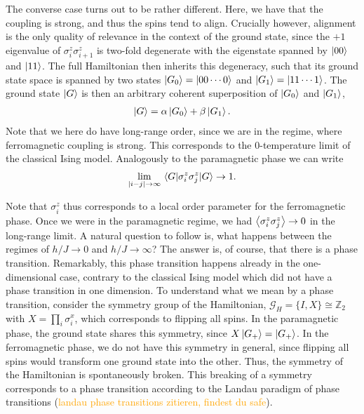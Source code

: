 The converse case turns out to be rather different. Here, we have that the
coupling is strong, and thus the spins tend to align. Crucially however,
alignment is the only quality of relevance in the context of the ground state,
since the $+1$ eigenvalue of $\sigma_i^z\sigma_{i+1}^z$ is two-fold degenerate
with the eigenstate spanned by $\ket{00}$ and $\ket{11}$. The full Hamiltonian
then inherits this degeneracy, such that its ground state space is spanned by
two states $\ket{G_0} = \ket{00\cdots 0}$ and $\ket{G_1} = \ket{11\cdots 1}$.
The ground state $\ket{G}$ is then an arbitrary coherent superposition of $\ket{G_0}$ and
$\ket{G_1}$,
\begin{align}
  \ket{G} = \alpha \ket{G_0} + \beta \ket{G_1}
.\end{align}
Note that we here do have long-range order, since we are in the
regime, where ferromagnetic coupling is strong. This corresponds to the
0-temperature limit of the classical Ising model. Analogously to the
paramagnetic phase we can write
\begin{align}
  \lim_{\abs{i-j}\to\infty} \expval{\sigma_i^z\sigma_j^z}{G} \to 1
.\end{align}

Note that $\sigma_i^z$ thus corresponds to a local order parameter for the
ferromagnetic phase. Once we were in the paramagnetic regime, we had
$\expval{\sigma_i^z\sigma_j^z}\to 0$ in the long-range limit. A natural
question to follow is, what happens between the regimes of
$h /J \to 0$ and $h /J \to \infty$? The answer is, of course, that there is a phase
transition. Remarkably, this phase transition happens already in the
one-dimensional case, contrary to the classical Ising model which did not have a phase
transition in one dimension. To understand what we mean by a phase 
transition, consider the symmetry group of the Hamiltonian, $\mathcal{G}_H =
\{I, X\} \cong \mathbb{Z}_2$ with $X = \prod_i \sigma_i^x$, which
corresponds to flipping all spins. In the paramagnetic phase, the ground state
shares this symmetry, since $X\ket{G_+} = \ket{G_+}$. In the ferromagnetic
phase, we do not have this symmetry in general, since flipping all spins would
transform one ground state into the other. Thus, the symmetry of the
Hamiltonian is spontaneously broken. This breaking of a symmetry corresponds to
a phase transition according to the Landau paradigm of phase transitions
(\textcolor{orange}{landau phase transitions zitieren, findest du safe}).
